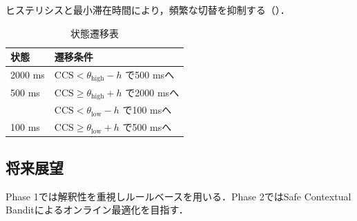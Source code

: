 ヒステリシスと最小滞在時間により，頻繁な切替を抑制する（）．

\begin{table}[tb]
  \centering
  \caption{状態遷移表}
  \begin{tabular}{ll}
    \toprule
    状態 & 遷移条件 \\
    \midrule
    2000 ms & $\mathrm{CCS}<\theta_{\mathrm{high}}-h$ で500 msへ \\
    500 ms & $\mathrm{CCS}\ge\theta_{\mathrm{high}}+h$ で2000 msへ \\
           & $\mathrm{CCS}<\theta_{\mathrm{low}}-h$ で100 msへ \\
    100 ms & $\mathrm{CCS}\ge\theta_{\mathrm{low}}+h$ で500 msへ \\
    \bottomrule
  \end{tabular}
\end{table}

\subsection{将来展望}

Phase 1では解釈性を重視しルールベースを用いる．Phase 2ではSafe Contextual Banditによるオンライン最適化を目指す．

